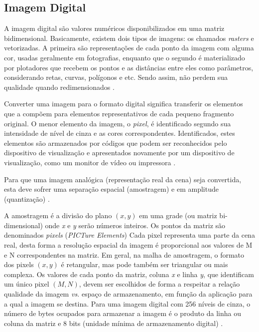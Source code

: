 \subsection{Imagem Digital}\label{subsec:imagem}

A imagem digital são valores numéricos disponibilizados em uma matriz bidimensional. Basicamente, existem dois tipos de imagens: os chamados \textit{rasters} e vetorizadas. A primeira são representações de cada ponto da imagem com alguma cor, usadas geralmente em fotografias, enquanto que o segundo é materializado por plotadores que recebem os pontos e as distâncias entre eles como parâmetros, considerando retas, curvas, polígonos e etc. Sendo assim, não perdem sua qualidade quando redimensionados \cite{img-digital-willians}.

Converter uma imagem para o formato digital significa transferir os elementos que a compõem para elementos representativos de cada pequeno fragmento original. O menor elemento da imagem, o \textit{pixel}, é identificado segundo sua intensidade de nível de cinza e as cores correspondentes. Identificados, estes elementos são armazenados por códigos que podem ser reconhecidos pelo dispositivo de visualização e apresentados novamente por um dispositivo de visualização, como um monitor de vídeo ou impressora \cite{img-digital-willians}. 



Para que uma imagem analógica (representação real da cena) seja convertida, esta deve sofrer uma separação espacial (amostragem) e em amplitude (quantização) \cite{img-digital-willians}. 

A amostragem é a divisão do plano $(x,y)$ em uma grade (ou matriz bi-dimensional) onde \textit{x} e \textit{y} serão números inteiros. Os pontos da matriz são denominados \textit{pixels} (\textit{PICTure Elements}) Cada pixel representa uma parte da cena real, desta forma a resolução espacial da imagem é proporcional aos valores de M e N correspondentes na matriz. Em geral, na malha de amostragem, o formato dos pixels $(x,y)$ é retangular, mas pode também ser triangular ou mais complexa. Os valores de cada ponto da matriz, coluna \textit{x} e linha \textit{y}, que identificam um único pixel $(M,N)$, devem ser escolhidos de forma a respeitar a relação qualidade da imagem \textit{vs.} espaço de armazenamento, em função da aplicação para a qual a imagem se destina. Para uma imagem digital com 256 níveis de cinza, o número de bytes ocupados para armazenar a imagem é o produto da linha ou coluna da matriz e 8 bits (unidade mínima de armazenamento digital) \cite{img-digital-willians}. 

